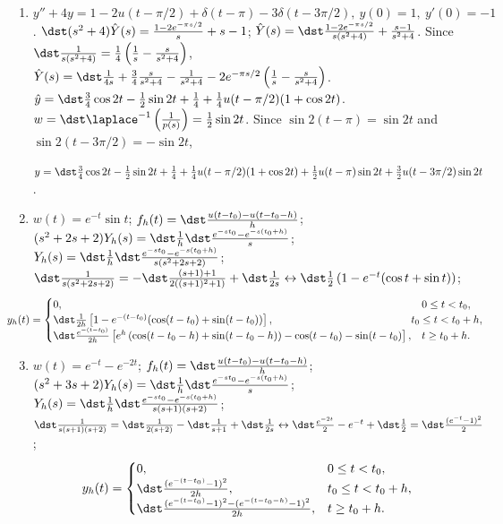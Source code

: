 \documentclass[openany]{book}
\newenvironment{sectionSolutions}{
 \begin{enumerate}[item-label={\thesection.\arabic{enumi}.}]
}{
 \end{enumerate}
}
\begin{document}
\begin{sectionSolutions}
$y=\dst{\frac{1}{4}\left(e^t-e^{-t}(1+6t)\right)-
u(t-1)(t-1)e^{-(t-1)}+2u(t-2)(t-2)e^{-(t-2)}}$.


\item
$y''+4y=1-2u(t-\pi/2)+\delta(t-\pi)-3\delta(t-3\pi/2),\ y(0)=1,\
y'(0)=-1$.
$\dst (s^2+4)\hat Y(s)=\frac{1-2e^{-\pi s/2}}{ s}+s-1$;
$\hat Y(s)=\dst\frac{1-2e^{-\pi s/2}}{ s(s^2+4)}+\frac{s-1}{ s^2+4}$.
Since
$\dst\frac{1}{ s(s^2+4)}=
\frac{1}{4}\left(\frac{1}{ s}-\frac{s}{ s^2+4}\right)$,
$\hat Y(s)=
\dst\frac{1}{4s}+\frac{3}{4}\frac{s}{ s^2+4}-\frac{1}{ s^2+4}
-2e^{-\pi s/2}\left(\frac{1}{ s}-\frac{s}{ s^2+4}\right)$.
$\hat
y=\dst\frac{3}{4}\cos2t-\frac{1}{2}\sin2t+\frac{1}{4}+\frac{1}{4}u(t-\pi/2)
(1+\cos2t)$.
$w=\dst\laplace ^{-1}\left(\frac{1}{ p(s)}\right)=\frac{1}{2}\sin2t$.
Since $\sin2(t-\pi)=\sin2t$ and $\sin2(t-3\pi/2)=-\sin2t$,


$y=\dst\frac{3}{4}\cos2t-\frac{1}{2}\sin2t+\frac{1}{4}+\frac{1}{4}u(t-\pi/2)
(1+\cos2t)+\frac{1}{2}u(t-\pi)\sin2t+\frac{3}{2}u(t-3\pi/2)\sin2t$.

\addtocounter{enumi}{4}
\item%
$w(t)=e^{-t}\sin t$;
$f_h(t)=\dst\frac{u(t-t_0)-u(t-t_0-h)}{ h}$;
$(s^2+2s+2)Y_h(s)=\dst\frac{1}{ h}\dst\frac{e^{-st_0}-e^{-s(t_0+h)}}{ s}$;
$Y_h(s)=\dst\frac{1}{ h}\dst\frac{e^{-st_0}-e^{-s(t_0+h)}}{ s(s^2+2s+2)}$;
$\dst\frac{1}{ s(s^2+2s+2)}=-\dst\frac{(s+1)+1}{2\left((s+1)^2+1\right)}
+\dst\frac{1}{2s}\leftrightarrow
\dst\frac{1}{2}\left(1-e^{-t}(\cos t+\sin t)\right)$;
\[
\hspace{-25pt}
y_h(t)=\begin{cases} 0,&0\le t<t_0,\\
\dst\frac{1}{2h}\left[1-e^{-(t-t_0)}(\cos(t-t_0)+\sin(t-t_0))\right],
&\hspace{-10pt}t_0\le t< t_0+h,\\
\dst\frac{e^{-(t-t_0)}}{2h}\left[e^h\left(\cos(t-t_0-h)+\sin(t-t_0-h)\right)
-\cos(t-t_0)-\sin(t-t_0)\right] ,&t\ge t_0+h.\end{cases}
\]

\item
$w(t)=e^{-t}-e^{-2t}$;
$f_h(t)=\dst\frac{u(t-t_0)-u(t-t_0-h)}{ h}$;
$(s^2+3s+2)Y_h(s)=\dst\frac{1}{ h}\dst\frac{e^{-st_0}-e^{-s(t_0+h)}}{ s}$;
$Y_h(s)=\dst\frac{1}{ h}\dst\frac{e^{-st_0}-e^{-s(t_0+h)}}{ s(s+1)(s+2)}$;
$\dst\frac{1}{ s(s+1)(s+2)}=\dst\frac{1}{2(s+2)}-\dst\frac{1}{
s+1}+\dst\frac{1}{2s}\leftrightarrow
\dst\frac{e^{-2t}}{2}-e^{-t}+\dst\frac{1}{2}=\dst\frac{(e^{-t}-1)^2}{2}$;
\[
y_h(t)=
\begin{cases} 0,&0\le t<t_0,\\
\dst\frac{(e^{-(t-t_0)}-1)^2}{2h}, &t_0\le t< t_0+h,\\
\dst\frac{(e^{-(t-t_0)}-1)^2-(e^{-(t-t_0-h)}-1)^2}{2h}, &t\ge t_0+h.
\end{cases}
\]


\end{sectionSolutions}
\end{document}
